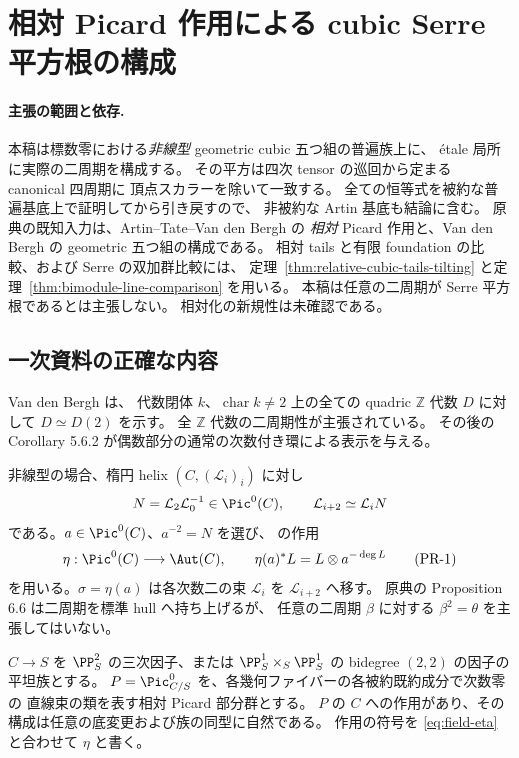\section{相対 Picard 作用による cubic Serre 平方根の構成}
\label{sec:relative-picard-roots}

\paragraph{主張の範囲と依存.}
本稿は標数零における\emph{非線型} geometric cubic 五つ組の普遍族上に、
étale 局所に実際の二周期を構成する。
その平方は四次 tensor の巡回から定まる canonical 四周期に
頂点スカラーを除いて一致する。
全ての恒等式を被約な普遍基底上で証明してから引き戻すので、
非被約な Artin 基底も結論に含む。
原典の既知入力は、Artin--Tate--Van den Bergh の
\emph{相対} Picard 作用と、Van den Bergh の geometric 五つ組の構成である。
相対 tails と有限 foundation の比較、および Serre の双加群比較には、
定理~\ref{thm:relative-cubic-tails-tilting} と定理~\ref{thm:bimodule-line-comparison} を用いる。
本稿は任意の二周期が Serre 平方根であるとは主張しない。
相対化の新規性は未確認である。

\subsection{一次資料の正確な内容}

Van den Bergh \cite[Proposition 5.6.1]{VdB2011} は、
代数閉体 $k$、$\operatorname{char}k\ne2$ 上の全ての quadric
$\mathbb Z$ 代数 $D$ に対して $D\simeq D(2)$ を示す。
全 $\mathbb Z$ 代数の二周期性が主張されている。
その後の Corollary 5.6.2 が偶数部分の通常の次数付き環による表示を与える。

非線型の場合、楕円 helix $(C,(\mathcal L_i)_i)$ に対し
\[
 N=\mathcal L_2\mathcal L_0^{-1}\in\Pic^0(C),\qquad
 \mathcal L_{i+2}\simeq\mathcal L_iN
\]
である。$a\in\Pic^0(C)$、$a^{-2}=N$ を選び、
\cite[Theorem 4.2.3]{VdB2011} の作用
\[
 \eta:\Pic^0(C)\longrightarrow\Aut(C),\qquad
 \eta(a)^*L=L\otimes a^{-\deg L}
 \tag{PR-1}\label{eq:field-eta}
\]
を用いる。$\sigma=\eta(a)$ は各次数二の束 $\mathcal L_i$ を $\mathcal L_{i+2}$ へ移す。
原典の Proposition 6.6 は二周期を標準 hull へ持ち上げるが、
任意の二周期 $\beta$ に対する $\beta^2=\theta$ を主張してはいない。

\begin{proposition}\label{prop:ATV-relative-action}
$C\to S$ を $\PP^2_S$ の三次因子、または
$\PP^1_S\times_S\PP^1_S$ の bidegree $(2,2)$ の因子の平坦族とする。
$P=\Pic^0_{C/S}$ を、各幾何ファイバーの各被約既約成分で次数零の
直線束の類を表す相対 Picard 部分群とする。
$P$ の $C$ への作用があり、その構成は任意の底変更および族の同型に自然である。
作用の符号を \eqref{eq:field-eta} と合わせて $\eta$ と書く。
\end{proposition}

